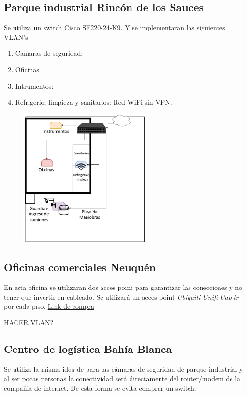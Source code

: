 \documentclass[11pt]{article}
\begin{document}
    \subsection*{Parque industrial Rincón de los Sauces}

    Se utiliza un switch Cisco SF220-24-K9. Y se implementaran las siguientes VLAN's: 

    \begin{enumerate}
        \item Camaras de seguridad: 
        \item Oficinas 
        \item Intrumentos: 
        \item Refrigerio, limpieza y sanitarios: Red WiFi sin VPN. 
    \end{enumerate}

    \begin{figure}[H]
        \centering
        \includegraphics[width=0.6\textwidth]{Figure/Parque Industrial.png}
    \end{figure}





    \subsection*{Oficinas comerciales Neuquén}

    En esta oficina se utilizaran dos acces point para garantizar las conecciones y no tener que invertir en cableado. Se utilizará un acces point \textit{Ubiquiti Unifi Uap-lr} por cada piso.
    \href{https://www.mercadolibre.com.ar/access-point-interior-ubiquiti-networks-unifi-ac-lr-ap-uap-ac-lr-blanco-1-unidad/p/MLA7953376?pdp_filters=category:MLA1700#searchVariation=MLA7953376&position=1&type=product&tracking_id=933ff74a-93c5-4a58-9a31-9fe5a3c5746e}{Link de compra}
    
    HACER VLAN?

    \subsection*{Centro de logística Bahía Blanca}
    Se utiliza la misma idea de para las cámaras de seguridad de parque industrial y al ser pocas personas la conectividad será directamente del router/modem 
    de la compañia de internet. De esta forma se evita comprar un switch. 

    
\end{document}
